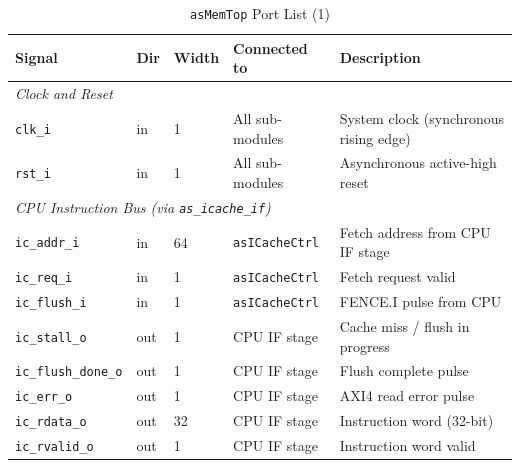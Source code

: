 \begin{table}[H]
\caption{\texttt{asMemTop} Port List (1)}
\label{tab:asMemTopPorts}
\centering
\begin{tabularx}{\textwidth}{|l |l |l |l |X|}
  \hline
  Signal & Dir & Width & Connected to & Description \\
  \hline
  \hline
  \multicolumn{5}{|l|}{\textit{Clock and Reset}} \\
  \hline
  \texttt{clk\_i}  & in & 1 & All sub-modules & System clock (synchronous rising edge) \\
  \hline
  \texttt{rst\_i}  & in & 1 & All sub-modules & Asynchronous active-high reset \\
  \hline
  \multicolumn{5}{|l|}{\textit{CPU Instruction Bus (via \texttt{as\_icache\_if})}} \\
  \hline
  \texttt{ic\_addr\_i}        & in  & 64 & \texttt{asICacheCtrl} & Fetch address from CPU IF stage \\
  \hline
  \texttt{ic\_req\_i}         & in  & 1  & \texttt{asICacheCtrl} & Fetch request valid \\
  \hline
  \texttt{ic\_flush\_i}       & in  & 1  & \texttt{asICacheCtrl} & FENCE.I pulse from CPU \\
  \hline
  \texttt{ic\_stall\_o}       & out & 1  & CPU IF stage          & Cache miss / flush in progress \\
  \hline
  \texttt{ic\_flush\_done\_o} & out & 1  & CPU IF stage          & Flush complete pulse \\
  \hline
  \texttt{ic\_err\_o}         & out & 1  & CPU IF stage          & AXI4 read error pulse \\
  \hline
  \texttt{ic\_rdata\_o}       & out & 32 & CPU IF stage          & Instruction word (32-bit) \\
  \hline
  \texttt{ic\_rvalid\_o}      & out & 1  & CPU IF stage          & Instruction word valid \\
  \hline
\end{tabularx}
\end{table}

